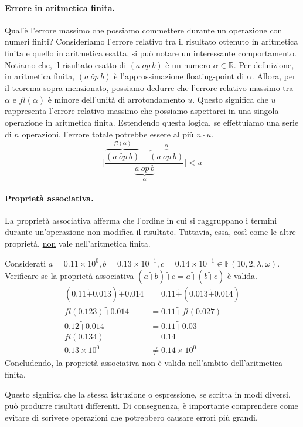 \documentclass{article}
\begin{document}
\paragraph{Errore in aritmetica finita.}
Qual'è l'errore massimo che possiamo commettere durante un operazione con numeri
finiti?
Consideriamo l'errore relativo tra il risultato ottenuto in aritmetica finita
e quello in aritmetica esatta, si può notare un interessante comportamento. 
Notiamo che, il risultato esatto di $(a\ op\ b)$ è un numero $\alpha\in
\mathbb{R}$. Per definizione, in aritmetica finita, $(a\ \tilde{op}\ b)$ è
l'approssimazione floating-point di $\alpha$.
Allora, per il teorema sopra menzionato, possiamo dedurre che l'errore relativo massimo tra
$\alpha$ e $fl(\alpha)$ è minore dell'unità di arrotondamento $u$. Questo
significa che $u$ rappresenta l'errore relativo massimo che possiamo
aspettarci in una singola operazione in aritmetica finita.
Estendendo questa logica, se effettuiamo una serie di $n$ operazioni, l'errore
totale potrebbe essere al più $n\cdot u$.
$$\Big\lvert \frac{\overset{fl(\alpha)}{\overbrace{(a\ \tilde{op}\ b)}}-\overset{\alpha}{\overbrace{(a\ op\
b)}}}{\underset{\alpha}{\underbrace{a\ op\ b}}}\Big\rvert<u$$
\paragraph{Proprietà associativa.} La proprietà associativa afferma che
l'ordine in cui si raggruppano i termini durante un'operazione non modifica il
risultato. Tuttavia, essa, così come le altre proprietà, \underline{non} vale nell'aritmetica finita.
\begin{example}
    Considerati $a=0.11\times10^0,b=0.13\times10^{-1},c=0.14\times10^{-1}\in
    \mathbb{F}(10,2,\lambda,\omega)$.
    Verificare se la proprietà associativa
    $(a\tilde+b)\tilde+c=a\tilde+(b\tilde+c)$ è valida.
    \begin{equation*}
        \begin{aligned}
            (0.11\tilde+0.013)\tilde+0.014&=0.11\tilde+(0.013\tilde+0.014) \\ 
            fl(0.123)\tilde+0.014&=0.11\tilde+fl(0.027)\\ 
            0.12\tilde+0.014&=0.11\tilde+0.03 \\ 
            fl(0.134)&=0.14 \\
            0.13\times10^0&\neq0.14\times10^0
        \end{aligned} 
    \end{equation*}
    Concludendo, la proprietà associativa non è valida nell'ambito dell'aritmetica finita.
\end{example}
Questo significa che la stessa istruzione o espressione, se scritta in modi
diversi, può produrre risultati differenti. 
Di conseguenza, è importante comprendere come evitare di scrivere operazioni che
potrebbero causare errori più grandi.
\end{document}
